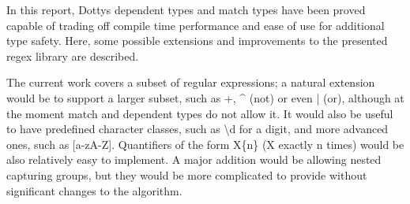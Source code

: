 In this report, Dotty\textquotesingle s dependent types and match types have been proved capable of trading off compile time performance and ease of use for additional type safety. Here, some possible extensions and improvements to the presented regex library are described.

The current work covers a subset of regular expressions; a natural extension would be to support a larger subset, such as +, \^{} (not) or even | (or), although at the moment match and dependent types do not allow it. It would also be useful to have predefined character classes, such as \textbackslash{}d for a digit, and more advanced ones, such as [a-zA-Z]. Quantifiers of the form X\{n\} (X exactly n times) would be also relatively easy to implement. A major addition would be allowing nested capturing groups, but they would be more complicated to provide without significant changes to the algorithm.